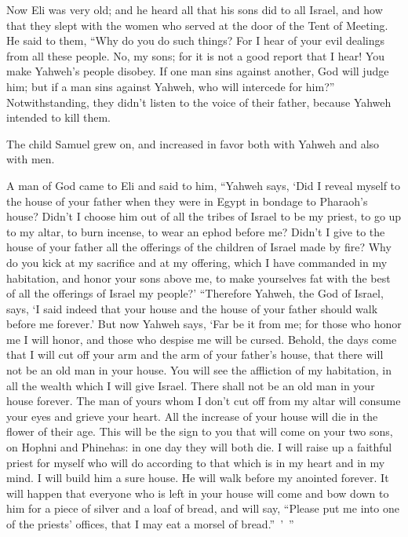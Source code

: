 {\par }{\PP {}Now Eli was very old; and he heard all that his sons did to all Israel, and how that they slept with the women who served at the door of the Tent of Meeting.
He said to them, “Why do you do such things? For I hear of your evil dealings from all these people.
No, my sons; for it is not a good report that I hear! You make Yahweh’s people disobey.
If one man sins against another, God will judge him; but if a man sins against Yahweh, who will intercede for him?” Notwithstanding, they didn’t listen to the voice of their father, because Yahweh intended to kill them.
\par }{\PP {}The child Samuel grew on, and increased in favor both with Yahweh and also with men.
\par }{\PP {}A man of God came to Eli and said to him, “Yahweh says, ‘Did I reveal myself to the house of your father when they were in Egypt in bondage to Pharaoh’s house?
Didn’t I choose him out of all the tribes of Israel to be my priest, to go up to my altar, to burn incense, to wear an ephod before me? Didn’t I give to the house of your father all the offerings of the children of Israel made by fire?
Why do you kick at my sacrifice and at my offering, which I have commanded in my habitation, and honor your sons above me, to make yourselves fat with the best of all the offerings of Israel my people?’
“Therefore Yahweh, the God of Israel, says, ‘I said indeed that your house and the house of your father should walk before me forever.’ But now Yahweh says, ‘Far be it from me; for those who honor me I will honor, and those who despise me will be cursed.
Behold, the days come that I will cut off your arm and the arm of your father’s house, that there will not be an old man in your house.
You will see the affliction of my habitation, in all the wealth which I will give Israel. There shall not be an old man in your house forever.
The man of yours whom I don’t cut off from my altar will consume your eyes and grieve your heart. All the increase of your house will die in the flower of their age.
This will be the sign to you that will come on your two sons, on Hophni and Phinehas: in one day they will both die.
I will raise up a faithful priest for myself who will do according to that which is in my heart and in my mind. I will build him a sure house. He will walk before my anointed forever.
It will happen that everyone who is left in your house will come and bow down to him for a piece of silver and a loaf of bread, and will say, “Please put me into one of the priests’ offices, that I may eat a morsel of bread.” ’ ”

}
